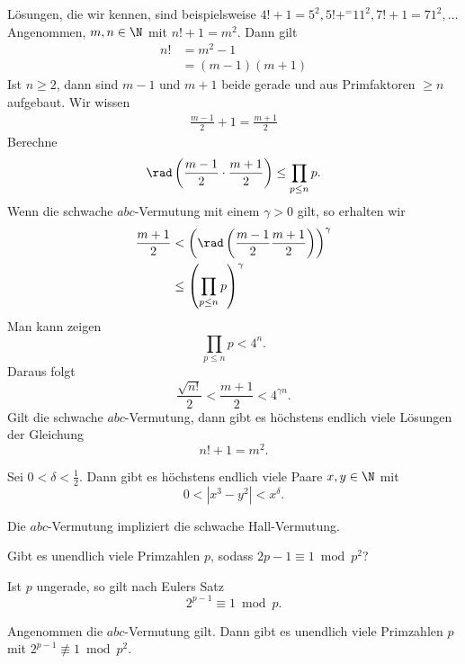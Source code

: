 Lösungen, die wir kennen, sind beispielsweise \( 4!+1=5^2, 5!+^=11^2, 7!+1=71^2,\dots \)\\
Angenommen, $m,n \in \N$ mit $n!+1=m^2$. Dann gilt
\begin{align*}
	n! &= m^2-1 \\ &=(m-1)(m+1)
\end{align*}
Ist $n \geq 2$, dann sind $m-1$ und $m+1$ beide gerade und aus Primfaktoren $\geq n$ aufgebaut. Wir wissen
\begin{align*}
	\frac{m-1}{2}+1 = \frac{m+1}{2}
\end{align*}
Berechne
\[ \rad \left( \frac{m-1}{2} \cdot \frac{m+1}{2} \right) \leq \prod_{p \leq n} p.\]
Wenn die schwache $abc$-Vermutung mit einem $\gamma>0$ gilt, so erhalten wir
\begin{align*}
	\frac{m+1}{2} &< \left( \rad \left( \frac{m-1}{2} \frac{m+1}{2} \right) \right)^\gamma\\
	&\leq \left( \prod_{p \leq n} p \right)^\gamma
\end{align*}
Man kann zeigen
\[ \prod_{p \leq n}p < 4^n. \]
Daraus folgt
\[ \frac{\sqrt{n!}}{2} < \frac{m+1}{2} < 4^{\gamma n}. \]
Gilt die schwache $abc$-Vermutung, dann gibt es höchstens endlich viele Lösungen der Gleichung
\[ n!+1 = m^2. \]

\begin{conj*}
	Sei $0 < \delta < \frac{1}{2}$. Dann gibt es höchstens endlich viele Paare $x,y \in \N$ mit
	\[ 0 < |x^3-y^2| < x^\delta. \]
\end{conj*}

\begin{thm*}
	Die $abc$-Vermutung impliziert die schwache Hall-Vermutung.
\end{thm*}

\begin{frage*}
	Gibt es unendlich viele Primzahlen $p$, sodass $2{p-1} \equiv 1 \bmod p^2$?
\end{frage*}

\begin{rem*}
	Ist $p$ ungerade, so gilt nach Eulers Satz
	\[ 2^{p-1} \equiv 1 \bmod p. \]
\end{rem*}

\begin{thm*}
	Angenommen die $abc$-Vermutung gilt. Dann gibt es unendlich viele Primzahlen $p$ mit $2^{p-1} \not\equiv 1 \bmod p^2$.
\end{thm*}